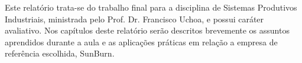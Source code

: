 \documentclass[
12pt,					%
openright,				%
twoside,				%
a4paper,				%
english,
brazil
]{ABNT/abntex2_report}
\begin{document}
	\imprimircapa


	\ABNTEXchapterfont\large\textbf{\resumoatitlename}
	\begin{flushleft}
		\normalsize
		\justify
		\normalfont
	Este relatório trata-se do trabalho final para a disciplina de Sistemas Produtivos Industriais, ministrada pelo Prof. Dr. Francisco Uchoa, e possui caráter avaliativo. Nos capítulos deste relatório serão descritos brevemente os assuntos aprendidos durante a aula e as aplicações práticas em relação a empresa de referência escolhida, SunBurn.

	\end{flushleft}
\vspace*{1cm}
\newpage
\end{document}

